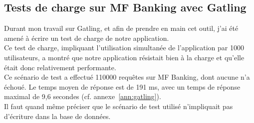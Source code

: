 \subsection*{Tests de charge sur MF Banking avec Gatling}

Durant mon travail sur Gatling, et afin de prendre en main cet outil, j'ai été amené à écrire un test de charge de notre application.\\
Ce test de charge, impliquant l'utilisation simultanée de l'application par 1000 utilisateurs, a montré que notre application résistait bien à la charge et qu'elle était donc relativement performante.\\
Ce scénario de test a effectué 110000 requêtes sur MF Banking, dont aucune n'a échoué. Le temps moyen de réponse est de 191 ms, avec un temps de réponse maximal de 9,6 secondes (cf. annexe~\ref{ann:gatling}).\\
Il faut quand même préciser que le scénario de test utilisé n'impliquait pas d'écriture dans la base de données.\\